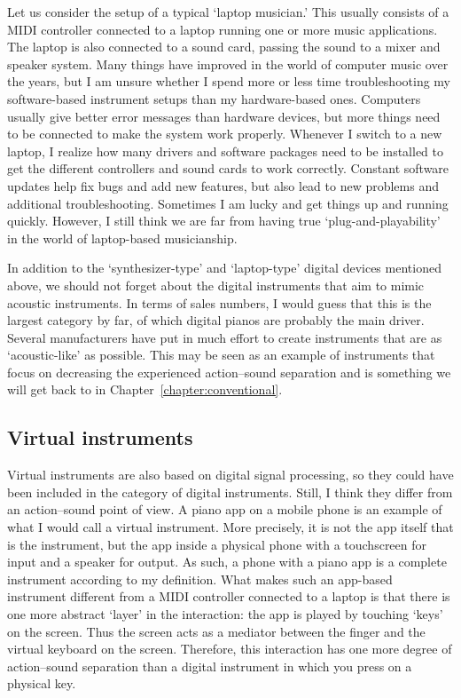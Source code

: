 Let us consider the setup of a typical `laptop musician.' This usually consists of a MIDI controller connected to a laptop running one or more music applications. The laptop is also connected to a sound card, passing the sound to a mixer and speaker system. Many things have improved in the world of computer music over the years, but I am unsure whether I spend more or less time troubleshooting my software-based instrument setups than my hardware-based ones. Computers usually give better error messages than hardware devices, but more things need to be connected to make the system work properly. Whenever I switch to a new laptop, I realize how many drivers and software packages need to be installed to get the different controllers and sound cards to work correctly. Constant software updates help fix bugs and add new features, but also lead to new problems and additional troubleshooting. Sometimes I am lucky and get things up and running quickly. However, I still think we are far from having true `plug-and-playability' in the world of laptop-based musicianship.

In addition to the `synthesizer-type' and `laptop-type' digital devices mentioned above, we should not forget about the digital instruments that aim to mimic acoustic instruments. In terms of sales numbers, I would guess that this is the largest category by far, of which digital pianos are probably the main driver. Several manufacturers have put in much effort to create instruments that are as `acoustic-like' as possible. This may be seen as an example of instruments that focus on decreasing the experienced action--sound separation and is something we will get back to in Chapter~\ref{chapter:conventional}.


\subsection{Virtual instruments}

Virtual instruments are also based on digital signal processing, so they could have been included in the category of digital instruments. Still, I think they differ from an action--sound point of view. A piano app on a mobile phone is an example of what I would call a virtual instrument. More precisely, it is not the app itself that is the instrument, but the app inside a physical phone with a touchscreen for input and a speaker for output. As such, a phone with a piano app is a complete instrument according to my definition. What makes such an app-based instrument different from a MIDI controller connected to a laptop is that there is one more abstract `layer' in the interaction: the app is played by touching `keys' on the screen. Thus the screen acts as a mediator between the finger and the virtual keyboard on the screen. Therefore, this interaction has one more degree of action--sound separation than a digital instrument in which you press on a physical key.

